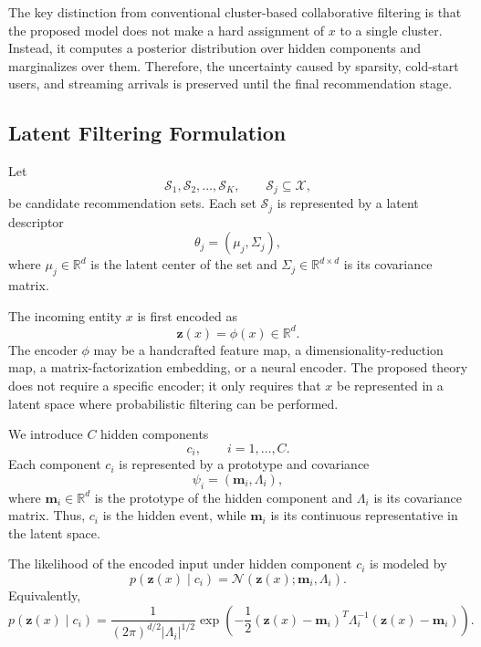 \documentclass{article}
\theoremstyle{plain}
\theoremstyle{definition}
\theoremstyle{remark}
\begin{document}
The key distinction from conventional cluster-based collaborative filtering is that the proposed model does not make a hard assignment of \(x\) to a single cluster. Instead, it computes a posterior distribution over hidden components and marginalizes over them. Therefore, the uncertainty caused by sparsity, cold-start users, and streaming arrivals is preserved until the final recommendation stage.

\subsection{Latent Filtering Formulation}
\label{subsec:latent_filtering}

Let
\[
\mathcal S_1,\mathcal S_2,\ldots,\mathcal S_K,
\qquad
\mathcal S_j\subseteq\mathcal X,
\]
be candidate recommendation sets. Each set \(\mathcal S_j\) is represented by a latent descriptor
\[
\theta_j=(\mu_j,\Sigma_j),
\]
where \(\mu_j\in\mathbb R^d\) is the latent center of the set and \(\Sigma_j\in\mathbb R^{d\times d}\) is its covariance matrix.

The incoming entity \(x\) is first encoded as
\[
\mathbf z(x)=\phi(x)\in\mathbb R^d.
\]
The encoder \(\phi\) may be a handcrafted feature map, a dimensionality-reduction map, a matrix-factorization embedding, or a neural encoder. The proposed theory does not require a specific encoder; it only requires that \(x\) be represented in a latent space where probabilistic filtering can be performed.

We introduce \(C\) hidden components
\[
c_i,\qquad i=1,\ldots,C.
\]
Each component \(c_i\) is represented by a prototype and covariance
\[
\psi_i=(\mathbf m_i,\Lambda_i),
\]
where \(\mathbf m_i\in\mathbb R^d\) is the prototype of the hidden component and \(\Lambda_i\) is its covariance matrix. Thus, \(c_i\) is the hidden event, while \(\mathbf m_i\) is its continuous representative in the latent space.

The likelihood of the encoded input under hidden component \(c_i\) is modeled by
\[
p(\mathbf z(x)\mid c_i)
=
\mathcal N(\mathbf z(x);\mathbf m_i,\Lambda_i).
\]
Equivalently,
\begin{equation}
	\label{eq:latent_likelihood}
	p(\mathbf z(x)\mid c_i)
	=
	\frac{1}{(2\pi)^{d/2}|\Lambda_i|^{1/2}}
	\exp\left(
	-\frac{1}{2}
	(\mathbf z(x)-\mathbf m_i)^T
	\Lambda_i^{-1}
	(\mathbf z(x)-\mathbf m_i)
	\right).
\end{equation}
\end{document}
